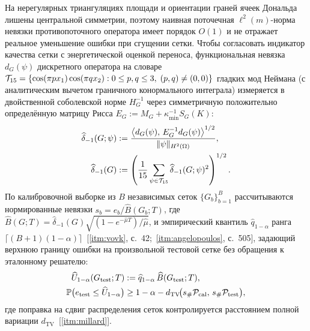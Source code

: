 На нерегулярных триангуляциях площади и ориентации граней ячеек Дональда лишены центральной симметрии, поэтому наивная поточечная $\ell^2(m)$-норма невязки противопоточного оператора имеет порядок $O(1)$ и не отражает реальное уменьшение ошибки при сгущении сетки. Чтобы согласовать индикатор качества сетки с энергетической оценкой переноса, функциональная невязка $d_G(\psi)$ дискретного оператора на словаре $\mathcal{T}_{15}=\{\cos(\pi p x_1)\cos(\pi q x_2): 0\le p,q\le 3,\;(p,q)\neq(0,0)\}$ гладких мод Неймана (с аналитическим вычетом граничного конормального интеграла) измеряется в двойственной соболевской норме $H_G^{-1}$ через симметричную положительно определённую матрицу Рисса $E_G := M_G + \kappa_{\min}^{-1}S_G(K)$:
\begin{equation}\label{eq:oit_dual}
\begin{aligned}
\widehat{\delta}_{-1}(G;\psi) &:= \frac{\bigl\langle d_G(\psi),\, E_G^{-1}d_G(\psi)\bigr\rangle^{1/2}}{\|\psi\|_{H^2(\Omega)}},\\
\widehat{\delta}_{-1}(G) &:= \left(\frac{1}{15}\sum_{\psi\in\mathcal{T}_{15}}\widehat{\delta}_{-1}(G;\psi)^2\right)^{1/2}.
\end{aligned}
\end{equation}
По калибровочной выборке из $B$ независимых сеток $\{G_b\}_{b=1}^B$ рассчитываются нормированные невязки $s_b = e_b / \widehat{B}(G_b;T)$, где $\widehat{B}(G;T)=\widehat{\delta}_{-1}(G)\sqrt{(1-e^{-\widehat{\mu}T})/\widehat{\mu}}$, и эмпирический квантиль $\widehat{q}_{1-\alpha}$ ранга $\lceil(B+1)(1-\alpha)\rceil$~[\ref{itm:vovk}, с.~42;~\ref{itm:angelopoulos}, с.~505], задающий верхнюю границу ошибки на произвольной тестовой сетке без обращения к эталонному решателю:
\begin{equation}\label{eq:oit_cp}
\begin{aligned}
\widehat{U}_{1-\alpha}(G_{\mathrm{test}};T) &:= \widehat{q}_{1-\alpha}\,\widehat{B}(G_{\mathrm{test}};T),\\
\mathbb{P}\bigl(e_{\mathrm{test}} \le \widehat{U}_{1-\alpha}\bigr) &\ge 1 - \alpha - d_{\mathrm{TV}}\!\bigl(s_\#\mathcal{P}_{\mathrm{cal}},\,s_\#\mathcal{P}_{\mathrm{test}}\bigr),
\end{aligned}
\end{equation}
где поправка на сдвиг распределения сеток контролируется расстоянием полной вариации $d_{\mathrm{TV}}$~[\ref{itm:millard}].

